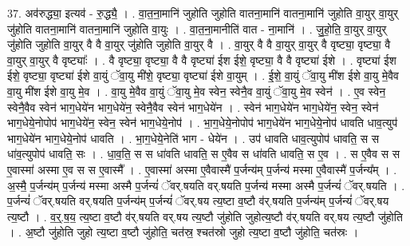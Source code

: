 \documentclass[17pt]{extarticle}
\begin{document}
37. अव॑रुद्ध्या॒ इत्यव॑ - रु॒द्ध्यै॒ । . वा॒त॒ना॒मानि॑ जुहोति जुहोति वातना॒मानि॑ वातना॒मानि॑ जुहोति वा॒युर् वा॒युर् जु॑होति वातना॒मानि॑ वातना॒मानि॑ जुहोति वा॒युः । . वा॒त॒ना॒मानीति॑ वात - ना॒मानि॑ । . जु॒हो॒ति॒ वा॒युर् वा॒युर् जु॑होति जुहोति वा॒युर् वै वै वा॒युर् जु॑होति जुहोति वा॒युर् वै । . वा॒युर् वै वै वा॒युर् वा॒युर् वै वृष्ट्या॒ वृष्ट्या॒ वै वा॒युर् वा॒युर् वै वृष्ट्याः᳚ । . वै वृष्ट्या॒ वृष्ट्या॒ वै वै वृष्ट्या॑ ईश ईशे॒ वृष्ट्या॒ वै वै वृष्ट्या॑ ईशे । . वृष्ट्या॑ ईश ईशे॒ वृष्ट्या॒ वृष्ट्या॑ ईशे वा॒युं ॅवा॒यु मी॑शे॒ वृष्ट्या॒ वृष्ट्या॑ ईशे वा॒युम् । . ई॒शे॒ वा॒युं ॅवा॒यु मी॑श ईशे वा॒यु मे॒वैव वा॒यु मी॑श ईशे वा॒यु मे॒व । . वा॒यु मे॒वैव वा॒युं ॅवा॒यु मे॒व स्वेन॒ स्वेनै॒व वा॒युं ॅवा॒यु मे॒व स्वेन॑ । . ए॒व स्वेन॒ स्वेनै॒वैव स्वेन॑ भाग॒धेये॑न भाग॒धेये॑न॒ स्वेनै॒वैव स्वेन॑ भाग॒धेये॑न । . स्वेन॑ भाग॒धेये॑न भाग॒धेये॑न॒ स्वेन॒ स्वेन॑ भाग॒धेये॒नोपोप॑ भाग॒धेये॑न॒ स्वेन॒ स्वेन॑ भाग॒धेये॒नोप॑ । . भा॒ग॒धेये॒नोपोप॑ भाग॒धेये॑न भाग॒धेये॒नोप॑ धावति धाव॒त्युप॑ भाग॒धेये॑न भाग॒धेये॒नोप॑ धावति । . भा॒ग॒धेये॒नेति॑ भाग - धेये॑न । . उप॑ धावति धाव॒त्युपोप॑ धावति॒ स स धा॑व॒त्युपोप॑ धावति॒ सः । . धा॒व॒ति॒ स स धा॑वति धावति॒ स ए॒वैव स धा॑वति धावति॒ स ए॒व । . स ए॒वैव स स ए॒वास्मा॑ अस्मा ए॒व स स ए॒वास्मै᳚ । . ए॒वास्मा॑ अस्मा ए॒वैवास्मै॑ प॒र्जन्य॑म् प॒र्जन्य॑ मस्मा ए॒वैवास्मै॑ प॒र्जन्य᳚म् । . अ॒स्मै॒ प॒र्जन्य॑म् प॒र्जन्य॑ मस्मा अस्मै प॒र्जन्यं॑ ॅवर्.षयति वर्.षयति प॒र्जन्य॑ मस्मा अस्मै प॒र्जन्यं॑ ॅवर्.षयति । . प॒र्जन्यं॑ ॅवर्.षयति वर्.षयति प॒र्जन्य॑म् प॒र्जन्यं॑ ॅवर्.षय त्य॒ष्टा व॒ष्टौ व॑र्.षयति प॒र्जन्य॑म् प॒र्जन्यं॑ ॅवर्.षय त्य॒ष्टौ । . व॒र्॒.ष॒य॒ त्य॒ष्टा व॒ष्टौ व॑र्.षयति वर्.षय त्य॒ष्टौ जु॑होति जुहोत्य॒ष्टौ व॑र्.षयति वर्.षय त्य॒ष्टौ जु॑होति । . अ॒ष्टौ जु॑होति जुहो त्य॒ष्टा व॒ष्टौ जु॑होति॒ चत॑स्र॒ श्चत॑स्रो जुहो त्य॒ष्टा व॒ष्टौ जु॑होति॒ चत॑स्रः । \newline
\pagebreak
{}
\end{document}
